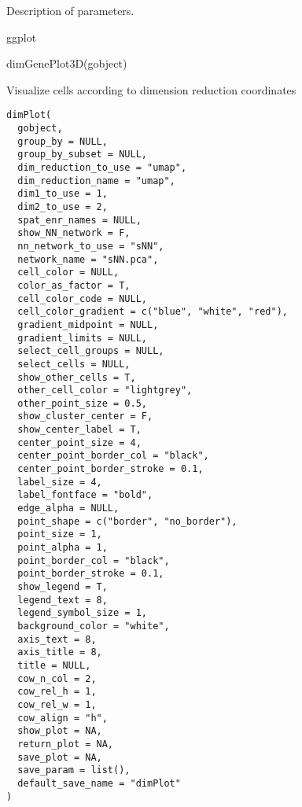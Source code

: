 \documentclass[a4paper]{book}
\begin{document}
%
\begin{Details}\relax
Description of parameters.
\end{Details}
%
\begin{Value}
ggplot
\end{Value}
%
\begin{Examples}
\begin{ExampleCode}
    dimGenePlot3D(gobject)
\end{ExampleCode}
\end{Examples}
%
\begin{Description}\relax
Visualize cells according to dimension reduction coordinates
\end{Description}
%
\begin{Usage}
\begin{verbatim}
dimPlot(
  gobject,
  group_by = NULL,
  group_by_subset = NULL,
  dim_reduction_to_use = "umap",
  dim_reduction_name = "umap",
  dim1_to_use = 1,
  dim2_to_use = 2,
  spat_enr_names = NULL,
  show_NN_network = F,
  nn_network_to_use = "sNN",
  network_name = "sNN.pca",
  cell_color = NULL,
  color_as_factor = T,
  cell_color_code = NULL,
  cell_color_gradient = c("blue", "white", "red"),
  gradient_midpoint = NULL,
  gradient_limits = NULL,
  select_cell_groups = NULL,
  select_cells = NULL,
  show_other_cells = T,
  other_cell_color = "lightgrey",
  other_point_size = 0.5,
  show_cluster_center = F,
  show_center_label = T,
  center_point_size = 4,
  center_point_border_col = "black",
  center_point_border_stroke = 0.1,
  label_size = 4,
  label_fontface = "bold",
  edge_alpha = NULL,
  point_shape = c("border", "no_border"),
  point_size = 1,
  point_alpha = 1,
  point_border_col = "black",
  point_border_stroke = 0.1,
  show_legend = T,
  legend_text = 8,
  legend_symbol_size = 1,
  background_color = "white",
  axis_text = 8,
  axis_title = 8,
  title = NULL,
  cow_n_col = 2,
  cow_rel_h = 1,
  cow_rel_w = 1,
  cow_align = "h",
  show_plot = NA,
  return_plot = NA,
  save_plot = NA,
  save_param = list(),
  default_save_name = "dimPlot"
)
\end{verbatim}
\end{Usage}
%
\end{document}
